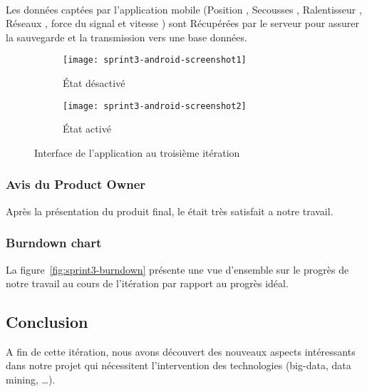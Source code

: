 \paragraph*{}
Les données captées par l'application mobile (Position , Secousses , Ralentisseur , Réseaux , force du 
signal et vitesse ) sont Récupérées par le serveur pour assurer la sauvegarde et la transmission vers une 
base données.\\

\begin{figure}[htbp]
\centering
    \begin{subfigure}{.45\textwidth}
    \centering
  \centering
  \texttt{[image: sprint3-android-screenshot1]}
  \caption{État désactivé}
  \label{fig:sprint3-android-screenshot1}
\end{subfigure}
\begin{subfigure}{.45\textwidth}
    \centering
  \centering
  \texttt{[image: sprint3-android-screenshot2]}
  \caption{État activé}
  \label{fig:sprint3-android-screenshot2}
\end{subfigure}
\caption{Interface de l'application au troisième itération}
\end{figure}
\clearpage

\subsubsection{Avis du Product Owner}

Après la présentation du produit final, le  était très satisfait
a notre travail.

\subsubsection{Burndown chart}

La figure~\ref{fig:sprint3-burndown} présente une vue d'ensemble sur le progrès
de notre travail au cours de l'itération par rapport au progrès idéal.



\subsection{Conclusion}

A fin de cette itération, nous avons découvert des nouveaux aspects intéressants dans notre projet
qui nécessitent l'intervention des technologies (big-data, data mining, \ldots).

